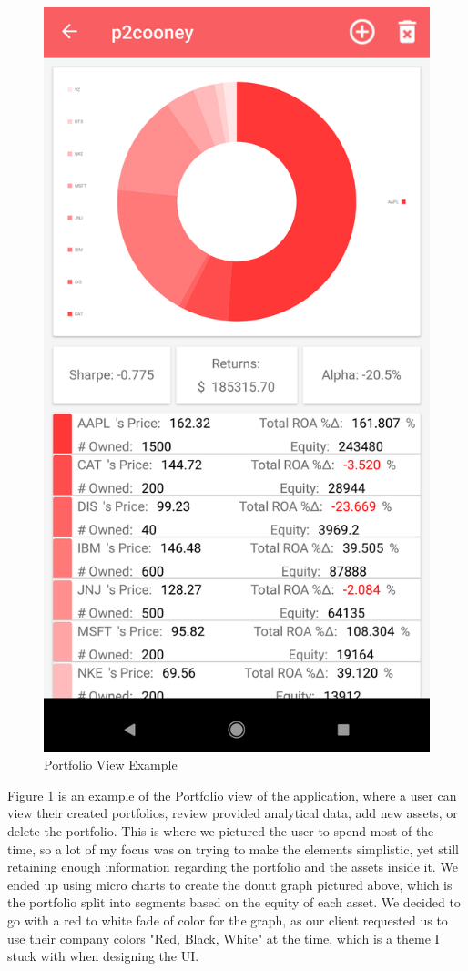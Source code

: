 \documentclass[letterpaper,10pt,titlepage,journal,compsoc,draftclsnofoot,onecolumn]{IEEEtran}
\begin{document}
\begin{figure}[h]
   \caption{Portfolio View Example}
   \centering
   \includegraphics[scale=.15]{spring_portfolio_screenshot}
\end{figure}

Figure 1 is an example of the Portfolio view of the application, where a user can view their created portfolios, review provided analytical data, add new assets, or delete the portfolio. This is where we pictured the user to spend most of the time, so a lot of my focus was on trying to make the elements simplistic, yet still retaining enough information regarding the portfolio and the assets inside it. We ended up using micro charts to create the donut graph pictured above, which is the portfolio split into segments based on the equity of each asset. We decided to go with a red to white fade of color for the graph, as our client requested us to use their company colors "Red, Black, White" at the time, which is a theme I stuck with when designing the UI.
\end{document}
